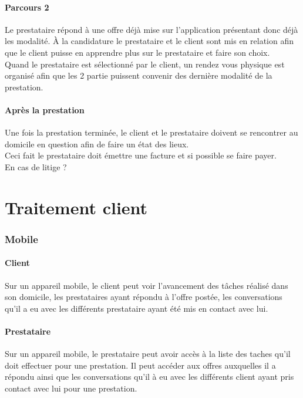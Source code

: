 \documentclass[a4paper,12pt]{article}
\begin{document}
\subsection{Parcours 2}
Le prestataire répond à une offre déjà mise sur l'application présentant donc déjà les modalité. À la candidature le prestataire et le client sont mis en relation afin que le client puisse en apprendre plus sur le prestataire et faire son choix.\\
Quand le prestataire est sélectionné par le client, un rendez vous physique est organisé afin que les 2 partie puissent convenir des dernière modalité de la prestation.

\subsection{Après la prestation}
Une fois la prestation terminée, le client et le prestataire doivent se rencontrer au domicile en question afin de faire un état des lieux.\\
Ceci fait le prestataire doit émettre une facture et si possible se faire payer.\\
En cas de litige ?

\newpage
\part{Traitement client}

\section{Mobile}

\subsection{Client}
Sur un appareil mobile, le client peut voir l'avancement des tâches réalisé dans son domicile, les prestataires ayant répondu à l'offre postée, les conversations qu'il a eu avec les différents prestataire ayant été mis en contact avec lui.

\subsection{Prestataire}
Sur un appareil mobile, le prestataire peut avoir accès à la liste des taches qu'il doit effectuer pour une prestation. Il peut accéder aux offres auxquelles il a répondu ainsi que les conversations qu'il à eu avec les différents client ayant pris contact avec lui pour une prestation.\\
\end{document}
